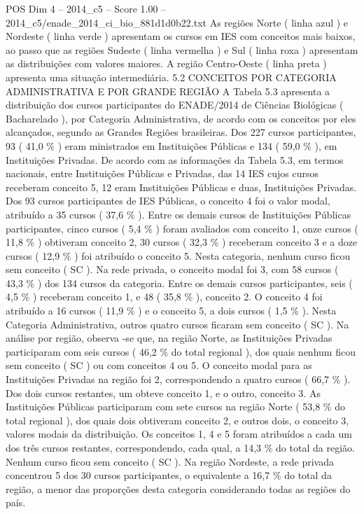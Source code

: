 \begin{textsample}{POS Dim 4 – 2014\_c5 – Score 1.00 – 2014\_c5/enade\_2014\_ci\_bio\_881d1d0b22.txt}
As regiões Norte ( linha azul ) e Nordeste ( linha verde ) apresentam os cursos em IES com conceitos mais baixos, ao passo que as regiões Sudeste ( linha vermelha ) e Sul ( linha roxa ) apresentam as distribuições com valores maiores.
A região Centro-Oeste ( linha preta ) apresenta uma situação intermediária. 5.2 CONCEITOS POR CATEGORIA ADMINISTRATIVA E POR GRANDE REGIÃO A Tabela 5.3 apresenta a distribuição dos cursos participantes do ENADE/2014 de Ciências Biológicas ( Bacharelado ), por Categoria Administrativa, de acordo com os conceitos por eles alcançados, segundo as Grandes Regiões brasileiras.
Dos 227 cursos participantes, 93 ( 41,0 \% ) eram ministrados em Instituições Públicas e 134 ( 59,0 \% ), em Instituições Privadas.
De acordo com as informações da Tabela 5.3, em termos nacionais, entre Instituições Públicas e Privadas, das 14 IES cujos cursos receberam conceito 5, 12 eram Instituições Públicas e duas, Instituições Privadas.
Dos 93 cursos participantes de IES Públicas, o conceito 4 foi o valor modal, atribuído a 35 cursos ( 37,6 \% ).
Entre os demais cursos de Instituições Públicas participantes, cinco cursos ( 5,4 \% ) foram avaliados com conceito 1, onze cursos ( 11,8 \% ) obtiveram conceito 2, 30 cursos ( 32,3 \% ) receberam conceito 3 e a doze cursos ( 12,9 \% ) foi atribuído o conceito 5.
Nesta categoria, nenhum curso ficou sem conceito ( SC ).
Na rede privada, o conceito modal foi 3, com 58 cursos ( 43,3 \% ) dos 134 cursos da categoria.
Entre os demais cursos participantes, seis ( 4,5 \% ) receberam conceito 1, e 48 ( 35,8 \% ), conceito 2.
O conceito 4 foi atribuído a 16 cursos ( 11,9 \% ) e o conceito 5, a dois cursos ( 1,5 \% ).
Nesta Categoria Administrativa, outros quatro cursos ficaram sem conceito ( SC ).
Na análise por região, observa -se que, na região Norte, as Instituições Privadas participaram com seis cursos ( 46,2 \% do total regional ), dos quais nenhum ficou sem conceito ( SC ) ou com conceitos 4 ou 5.
O conceito modal para as Instituições Privadas na região foi 2, correspondendo a quatro cursos ( 66,7 \% ).
Dos dois cursos restantes, um obteve conceito 1, e o outro, conceito 3.
As Instituições Públicas participaram com sete cursos na região Norte ( 53,8 \% do total regional ), dos quais dois obtiveram conceito 2, e outros dois, o conceito 3, valores modais da distribuição.
Os conceitos 1, 4 e 5 foram atribuídos a cada um dos três cursos restantes, correspondendo, cada qual, a 14,3 \% do total da região.
Nenhum curso ficou sem conceito ( SC ).
Na região Nordeste, a rede privada concentrou 5 dos 30 cursos participantes, o equivalente a 16,7 \% do total da região, a menor das proporções desta categoria considerando todas as regiões do país.

\end{textsample}
